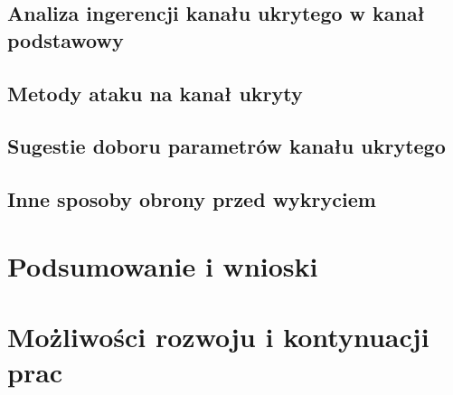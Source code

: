 \documentclass[a4paper, twoside]{report}
\begin{document}
    \section{Analiza ingerencji kanału ukrytego w kanał podstawowy}
    \section{Metody ataku na kanał ukryty}
    \section{Sugestie doboru parametrów kanału ukrytego}
    \section{Inne sposoby obrony przed wykryciem}

\chapter{Podsumowanie i wnioski}
\chapter{Możliwości rozwoju i kontynuacji prac}

\clearpage
{}


\end{document}
